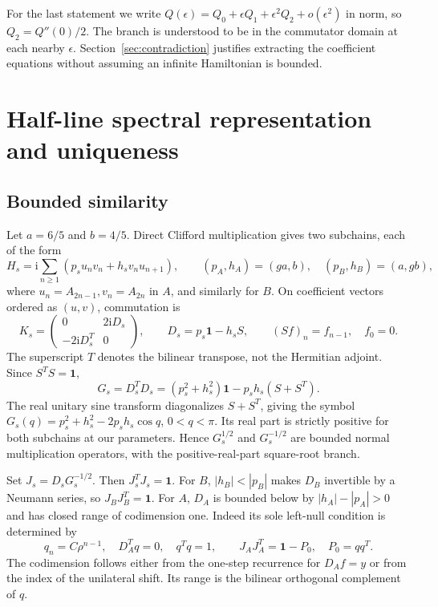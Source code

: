 \documentclass[11pt,a4paper]{article}
\newcommand{\ii}{\mathrm{i}}
\newcommand{\Id}{\mathbf{1}}
\begin{document}
For the last statement we write $Q(\epsilon)=Q_0+\epsilon Q_1+
\epsilon^2Q_2+o(\epsilon^2)$ in norm, so $Q_2=Q''(0)/2$.
The branch is understood to be in the commutator domain at each nearby
$\epsilon$. Section~\ref{sec:contradiction} justifies extracting the
coefficient equations without assuming an infinite Hamiltonian is bounded.

\section{Half-line spectral representation and uniqueness}
\subsection{Bounded similarity}
Let $a=6/5$ and $b=4/5$. Direct Clifford multiplication gives two subchains,
each of the form
\begin{equation}
 H_s=\ii\sum_{n\geq1}(p_s u_n v_n+h_s v_n u_{n+1}),\qquad
 (p_A,h_A)=(ga,b),\quad(p_B,h_B)=(a,gb),\label{eq:subchain}
\end{equation}
where $u_n=A_{2n-1},v_n=A_{2n}$ in $A$, and similarly for $B$.
On coefficient vectors ordered as $(u,v)$, commutation is
\begin{equation}
 K_s=\begin{pmatrix}0&2\ii D_s\\-2\ii D_s^T&0\end{pmatrix},\qquad
 D_s=p_s\Id-h_s S,\qquad (Sf)_n=f_{n-1},\quad f_0=0.\label{eq:k}
\end{equation}
The superscript $T$ denotes the bilinear transpose, not the Hermitian
adjoint. Since $S^TS=\Id$,
\begin{equation}
 G_s=D_s^TD_s=(p_s^2+h_s^2)\Id-p_sh_s(S+S^T).\label{eq:g}
\end{equation}
The real unitary sine transform diagonalizes $S+S^T$, giving the symbol
$G_s(q)=p_s^2+h_s^2-2p_sh_s\cos q$, $0<q<\pi$. Its real part is
strictly positive for both subchains at our parameters. Hence $G_s^{1/2}$
and $G_s^{-1/2}$ are bounded normal multiplication operators, with the
positive-real-part square-root branch.

Set $J_s=D_sG_s^{-1/2}$. Then $J_s^TJ_s=\Id$.
For $B$, $|h_B|<|p_B|$ makes $D_B$ invertible by a Neumann series, so
$J_BJ_B^T=\Id$. For $A$, $D_A$ is bounded below by
$|h_A|-|p_A|>0$ and has closed range of codimension one. Indeed its sole
left-null condition is determined by
\begin{equation}
 q_n=C\rho^{n-1},\quad D_A^Tq=0,\quad q^Tq=1,\qquad
 J_AJ_A^T=\Id-P_0,\quad P_0=qq^T.\label{eq:projector}
\end{equation}
The codimension follows either from the one-step recurrence for $D_Af=y$
or from the index of the unilateral shift. Its range is the bilinear
orthogonal complement of $q$.
\end{document}
